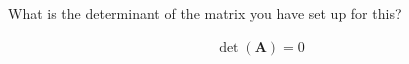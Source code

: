 What is the determinant of the matrix you have set up for this?

\begin{solution}
    \begin{align*}
        \det\left(\boldsymbol{A}\right) = 0
    \end{align*}
\end{solution}